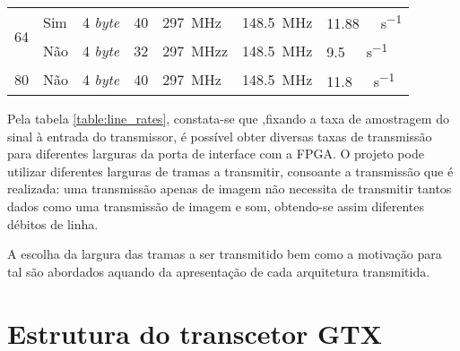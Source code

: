 \begin{table}[h!]
{\begin{tabular}{@{}lllllll@{}}
			\multirow{2}{*}{64}                                                        & Sim                                                                    & 4 \textit{byte}                                                                  & 40                                                                                 & \SI{297}{\mega\hertz}                & \SI{148.5}{\mega\hertz}              & \SI{11.88}{\giga\bit\per\second}                                                              \\
			& Não                                                                    & 4 \textit{byte}                                                                  & 32                                                                                 & \SI{297}{\mega\hertz}z                & \SI{148.5}{\mega\hertz}               & \SI{9.5}{\giga\bit\per\second}                                                                \\ \hline
			80                                                                         & Não                                                                    & 4 \textit{byte}                                                                  & 40                                                                                 & \SI{297}{\mega\hertz}                & \SI{148.5}{\mega\hertz}               & \SI{11.8}{\giga\bit\per\second}                                                              \\ \toprule
		\end{tabular}%
	}
\end{table}


Pela tabela \ref{table:line_rates}, constata-se que ,fixando a taxa de amostragem do sinal à entrada do transmissor, é possível obter diversas taxas de transmissão para diferentes larguras da porta de interface com a FPGA. O projeto pode utilizar diferentes larguras de tramas a transmitir, consoante a transmissão que é realizada: uma transmissão apenas de imagem não necessita de transmitir tantos dados como uma transmissão de imagem e som, obtendo-se assim diferentes débitos de linha.

A escolha da largura das tramas a ser transmitido bem como a motivação para tal são abordados aquando da apresentação de cada arquitetura transmitida.

\section{Estrutura do transcetor GTX}

